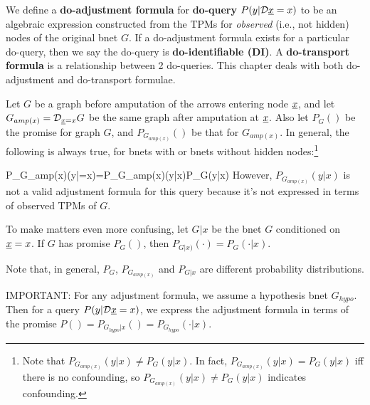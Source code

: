 We define a {\bf do-adjustment formula}
for {\bf do-query}
$P(y|\cald\rvx=x)$
to be an algebraic expression  
constructed from the TPMs for {\it observed} (i.e., not hidden) nodes of the original bnet $G$.
If a do-adjustment formula
exists for a
particular do-query,
then we say the do-query is
 {\bf do-identifiable (DI)}.
A {\bf do-transport formula}
is a relationship between 2  do-queries.
This chapter deals with both
do-adjustment and do-transport
formulae.

Let $G$ be a graph before
amputation
of the arrows entering node $\rvx$,
and let $G_{amp(x)}=\cald_{\rvx=x}G$
be the same graph after amputation
at $\rvx$.
Also let $P_G()$ be
the promise
for graph $G$, and $P_{G_{amp(x)}}()$
be that for $G_{amp(x)}$.
In general, the
following is always true,
for bnets
with or bnets without hidden nodes:\footnote{Note that $P_{G_{amp(x)}}(y|x)\neq P_G(y|x)$.
In fact,
$P_{G_{amp(x)}}(y|x)= P_G(y|x)$
iff there is no confounding,
so $P_{G_{amp(x)}}(y|x)\neq P_G(y|x)$
indicates confounding.
}

\beq
P_{G_{amp(x)}}(y|\cald\rvx=x)=P_{G_{amp(x)}}(y|x)\neq P_G(y|x)
\;
\eeq
However, $P_{G_{amp(x)}}(y|x)$ is
not a valid adjustment formula
for this query
because it's not expressed in terms
of observed TPMs of $G$.

To make matters even more confusing, let $G|x$
be the bnet $G$ conditioned on $\rvx=x$. If $G$ has promise $P_G()$,
then  $P_{G|x)}(\cdot) = P_G(\cdot|x)$.
 
Note that, in general,  $P_G$, $P_{G_{amp(x)}}$ and $P_{G|x}$ are
different probability distributions. 

IMPORTANT: For any adjustment formula, we assume
a hypothesis bnet $G_{hypo}$.
Then for a query
$P(y|\cald\rvx=x)$, we express the adjustment
formula in terms of the promise $P()=P_{G_{hypo}|x}()=P_{G_{hypo}}(\cdot|x)$.




